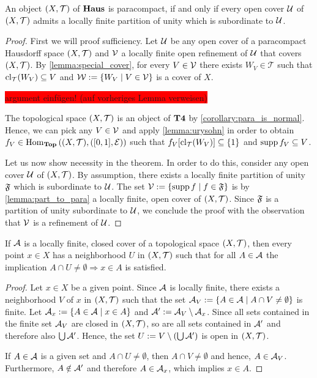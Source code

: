 \begin{theorem}\label{theorem:para_part}
	An object $\tspace$ of $\Haus$ is paracompact, if and only if every open cover $\cover$ of $\tspace$ admits a locally finite partition of unity which is subordinate to $\cover$.  
\end{theorem}
\begin{proof}
	First we will proof sufficiency. Let $\cover$ be any open cover of a paracompact Hausdorff space $\tspace$ and $\cover[V]$ a locally finite open refinement of $\cover$ that covers $\tspace$. By \ref{lemma:special_cover}, for every $V \in \cover[V]$ there exists $W_V \in \mathcal{T}$ such that $\cl{W_V} \subseteq V$ and $\cover[W] := \Bbraces{W_V \mid V \in \cover[V]}$ is a cover of $X$. 
	
	\colorbox{red}{argument einfügen! (auf vorheriges Lemma verweisen)}
	
	The topological space $\tspace$ is an object of $\Normal$ by \ref{corollary:para_is_normal}. Hence, we can pick any $V \in \cover[V]$ and apply \ref{lemma:urysohn} in order to obtain $f_V \in \Hom_\Top\pbraces{\tspace, \eucl}$ such that $f_V\bbraces{\cl{W_V}} \subseteq \{1\}$ and $\supp f_V \subseteq V$.
		
	Let us now show necessity in the theorem. In order to do this, consider any open cover $\cover$ of $\tspace$. By assumption, there exists a locally finite partition of unity $\partition$ which is subordinate to $\cover$. The set $\cover[V] := \Bbraces{\supp f \mid f \in \partition}$ is by \ref{lemma:part_to_para} a locally finite, open cover of $\tspace$. Since $\partition$ is a partition of unity subordinate to $\cover$, we conclude the proof with the observation that $\cover[V]$ is a refinement of $\cover$. 
\end{proof}

\begin{lemma}\label{lemma:loc_fin_nbhd}
	If $\cover[A]$ is a locally finite, closed cover of a topological space $\tspace$, then every point $x \in X$ has a neighborhood $U$ in $\tspace$ such that for all $A \in \cover[A]$ the implication $A \cap U \neq \emptyset \Rightarrow x \in A$ is satisfied.
\end{lemma}
\begin{proof}
	Let $x \in X$ be a given point. Since $\cover[A]$ is locally finite, there exists a neighborhood $V$ of $x$ in $\tspace$ such that the set $\cover[A]_V := \Bbraces{A \in \cover[A] \mid A \cap V \neq \emptyset}$ is finite. Let $\cover[A]_x := \Bbraces{A \in \cover[A] \mid x \in A}$ and $\cover[A]^\prime := \cover[A]_V \setminus \cover[A]_x$. Since all sets contained in the finite set $\cover[A]_V$ are closed in $\tspace$, so are all sets contained in $\cover[A]^\prime$ and therefore also $\bigcup \cover[A]^\prime$. Hence, the set $U := V \setminus \pbraces{\bigcup \cover[A]^\prime}$ is open in $\tspace$. 
	
	If $A \in \cover[A]$ is a given set and $A \cap U \neq \emptyset$, then $A \cap V \neq \emptyset$ and hence, $A \in \cover[A]_V$. Furthermore, $A \notin \cover[A]^\prime$ and therefore $A \in \cover[A]_x$, which implies $x \in A$. 
\end{proof}

